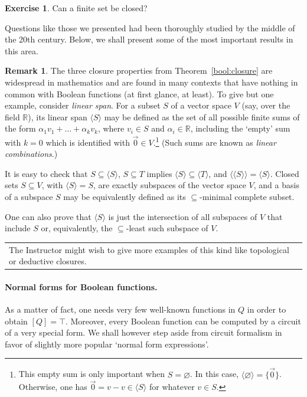 \documentclass[12pt,notitlepage]{article}
\theoremstyle{plain}
\theoremstyle{definition}
\newtheorem{exc}[thm]{Exercise}
\newtheorem{rem}[thm]{Remark}
\theoremstyle{plain}
\newcommand{\R}{\mathbb{R}}
\newcommand{\sbs}{\subseteq}
\newcommand{\void}{\varnothing}
\newcommand{\1}{\mathbf{1}}
\newcommand{\0}{\mathbf{0}}
\newcommand{\mcomm}[1]{
\medskip\noindent\begin{tabular}{| l}
\parbox{0.99\textwidth}{{\small
#1 }}\end{tabular}
\smallskip}
\begin{document}
\begin{exc}
Can a finite set be closed?
\end{exc}

Questions like those we presented had been thoroughly studied by the middle of the 20th century. Below, we shall present some of the most important results in this area.

\begin{rem}
The three closure properties from Theorem~\ref{bool:closure} are widespread in mathematics and are found in many contexts that have nothing in common with Boolean functions (at first glance, at least). To give but one example, consider \emph{linear span}. For a subset $S$ of a vector space $V$ (say, over the field $\R$), its linear span $\langle S \rangle$ may be defined as the set of all possible finite sums of the form $\alpha_1 v_1 + \ldots + \alpha_k v_k$, where $v_i \in S$ and $\alpha_i \in \R$, including the `empty' sum with $k = 0$ which is identified with $\vec 0 \in V$.\footnote{This empty sum is only important when $S = \void$. In this case, $\langle \void \rangle = \{\vec 0\}$. Otherwise, one has $\vec 0 = v - v \in \langle S \rangle$ for whatever $v \in S$.} (Such sums are known as \emph{linear combinations}.)

It is easy to check that $S \sbs \langle S \rangle$, $S \sbs T$ implies $\langle S \rangle \sbs \langle T \rangle$, and $\langle \langle S \rangle \rangle = \langle S \rangle$. Closed sets $S \sbs V$, with $\langle S \rangle = S$, are exactly subspaces of the vector space $V$, and a basis of a subspace $S$ may be equivalently defined as its ${\sbs}$-minimal complete subset.

One can also prove that $\langle S \rangle$ is just the intersection of all subspaces of $V$ that include $S$ or, equivalently, the ${\sbs}$-least such subspace of $V$.
\end{rem}

\mcomm{The Instructor might wish to give more examples of this kind like topological or deductive closures.}

\paragraph{Normal forms for Boolean functions.} As a matter of fact, one needs very few well-known functions in $Q$ in order to obtain $[Q] = \top$. Moreover, every Boolean function can be computed by a circuit of a very special form. We shall however step aside from circuit formalism in favor of slightly more popular `normal form expressions'.
\end{document}
